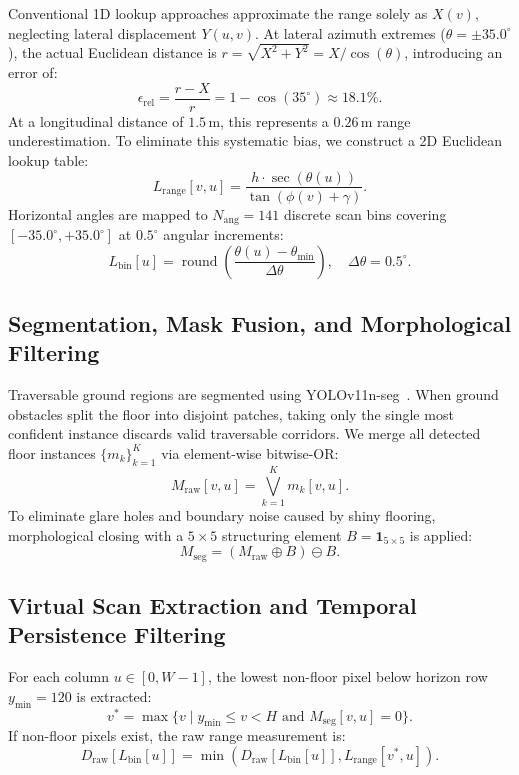 \documentclass[12pt]{iopart}
\begin{document}
Conventional 1D lookup approaches approximate the range solely as $X(v)$, neglecting lateral displacement $Y(u, v)$. At lateral azimuth extremes ($\theta = \pm 35.0^\circ$), the actual Euclidean distance is $r = \sqrt{X^2 + Y^2} = X / \cos(\theta)$, introducing an error of:
\begin{equation}
  \epsilon_{\mathrm{rel}} = \frac{r - X}{r} = 1 - \cos(35^\circ) \approx 18.1\%.
\end{equation}
At a longitudinal distance of $1.5$\,m, this represents a $0.26$\,m range underestimation. To eliminate this systematic bias, we construct a 2D Euclidean lookup table:
\begin{equation}
  L_{\mathrm{range}}[v, u] = \frac{h \cdot \sec(\theta(u))}{\tan(\phi(v) + \gamma)}.
\end{equation}
Horizontal angles are mapped to $N_{\mathrm{ang}} = 141$ discrete scan bins covering $[-35.0^\circ, +35.0^\circ]$ at $0.5^\circ$ angular increments:
\begin{equation}
  L_{\mathrm{bin}}[u] = \operatorname{round}\left(\frac{\theta(u) - \theta_{\min}}{\Delta \theta}\right), \quad \Delta \theta = 0.5^\circ.
\end{equation}

\subsection{Segmentation, Mask Fusion, and Morphological Filtering}
Traversable ground regions are segmented using YOLOv11n-seg~\cite{ultralytics_2024_ultralytics}. When ground obstacles split the floor into disjoint patches, taking only the single most confident instance discards valid traversable corridors. We merge all detected floor instances $\{m_k\}_{k=1}^K$ via element-wise bitwise-OR:
\begin{equation}
  M_{\mathrm{raw}}[v, u] = \bigvee_{k=1}^K m_k[v, u].
\end{equation}
To eliminate glare holes and boundary noise caused by shiny flooring, morphological closing with a $5 \times 5$ structuring element $B = \mathbf{1}_{5 \times 5}$ is applied:
\begin{equation}
  M_{\mathrm{seg}} = (M_{\mathrm{raw}} \oplus B) \ominus B.
\end{equation}

\subsection{Virtual Scan Extraction and Temporal Persistence Filtering}
For each column $u \in [0, W-1]$, the lowest non-floor pixel below horizon row $y_{\min} = 120$ is extracted:
\begin{equation}
  v^* = \max \{v \mid y_{\min} \le v < H \text{ and } M_{\mathrm{seg}}[v, u] = 0\}.
\end{equation}
If non-floor pixels exist, the raw range measurement is:
\begin{equation}
  D_{\mathrm{raw}}[L_{\mathrm{bin}}[u]] = \min\left(D_{\mathrm{raw}}[L_{\mathrm{bin}}[u]], L_{\mathrm{range}}[v^*, u]\right).
\end{equation}
\end{document}
